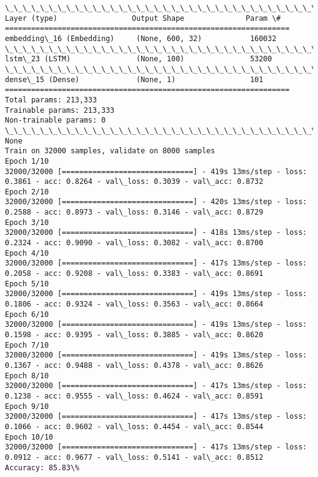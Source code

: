 \documentclass[11pt]{article}
\begin{document}
    \begin{Verbatim}[commandchars=\\\{\}]
\_\_\_\_\_\_\_\_\_\_\_\_\_\_\_\_\_\_\_\_\_\_\_\_\_\_\_\_\_\_\_\_\_\_\_\_\_\_\_\_\_\_\_\_\_\_\_\_\_\_\_\_\_\_\_\_\_\_\_\_\_\_\_\_\_
Layer (type)                 Output Shape              Param \#   
=================================================================
embedding\_16 (Embedding)     (None, 600, 32)           160032    
\_\_\_\_\_\_\_\_\_\_\_\_\_\_\_\_\_\_\_\_\_\_\_\_\_\_\_\_\_\_\_\_\_\_\_\_\_\_\_\_\_\_\_\_\_\_\_\_\_\_\_\_\_\_\_\_\_\_\_\_\_\_\_\_\_
lstm\_23 (LSTM)               (None, 100)               53200     
\_\_\_\_\_\_\_\_\_\_\_\_\_\_\_\_\_\_\_\_\_\_\_\_\_\_\_\_\_\_\_\_\_\_\_\_\_\_\_\_\_\_\_\_\_\_\_\_\_\_\_\_\_\_\_\_\_\_\_\_\_\_\_\_\_
dense\_15 (Dense)             (None, 1)                 101       
=================================================================
Total params: 213,333
Trainable params: 213,333
Non-trainable params: 0
\_\_\_\_\_\_\_\_\_\_\_\_\_\_\_\_\_\_\_\_\_\_\_\_\_\_\_\_\_\_\_\_\_\_\_\_\_\_\_\_\_\_\_\_\_\_\_\_\_\_\_\_\_\_\_\_\_\_\_\_\_\_\_\_\_
None
Train on 32000 samples, validate on 8000 samples
Epoch 1/10
32000/32000 [==============================] - 419s 13ms/step - loss: 0.3861 - acc: 0.8264 - val\_loss: 0.3039 - val\_acc: 0.8732
Epoch 2/10
32000/32000 [==============================] - 420s 13ms/step - loss: 0.2588 - acc: 0.8973 - val\_loss: 0.3146 - val\_acc: 0.8729
Epoch 3/10
32000/32000 [==============================] - 418s 13ms/step - loss: 0.2324 - acc: 0.9090 - val\_loss: 0.3082 - val\_acc: 0.8700
Epoch 4/10
32000/32000 [==============================] - 417s 13ms/step - loss: 0.2058 - acc: 0.9208 - val\_loss: 0.3383 - val\_acc: 0.8691
Epoch 5/10
32000/32000 [==============================] - 419s 13ms/step - loss: 0.1806 - acc: 0.9324 - val\_loss: 0.3563 - val\_acc: 0.8664
Epoch 6/10
32000/32000 [==============================] - 419s 13ms/step - loss: 0.1598 - acc: 0.9395 - val\_loss: 0.3885 - val\_acc: 0.8620
Epoch 7/10
32000/32000 [==============================] - 419s 13ms/step - loss: 0.1367 - acc: 0.9488 - val\_loss: 0.4378 - val\_acc: 0.8626
Epoch 8/10
32000/32000 [==============================] - 417s 13ms/step - loss: 0.1238 - acc: 0.9555 - val\_loss: 0.4624 - val\_acc: 0.8591
Epoch 9/10
32000/32000 [==============================] - 417s 13ms/step - loss: 0.1066 - acc: 0.9602 - val\_loss: 0.4454 - val\_acc: 0.8544
Epoch 10/10
32000/32000 [==============================] - 417s 13ms/step - loss: 0.0912 - acc: 0.9677 - val\_loss: 0.5141 - val\_acc: 0.8512
Accuracy: 85.83\%

    \end{Verbatim}
\end{document}
